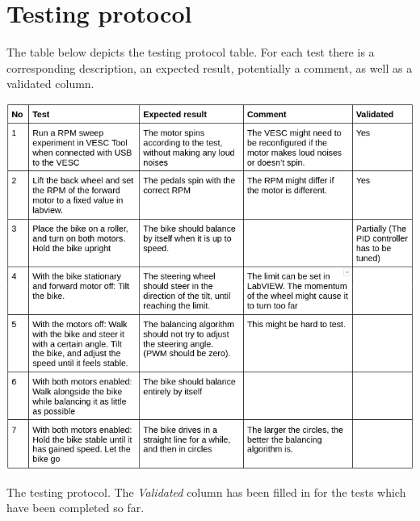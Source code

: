 \chapter{Testing protocol} \label{testingProtocol}

The table below depicts the testing protocol table. For each test there is a corresponding description, an expected result, potentially a comment, as well as a validated column.

\begin{table}[h]
    \centering
    \includegraphics[width=\textwidth]{figure/testing protocol.png}
    \caption{The testing protocol. The \textit{Validated} column has been filled in for the tests which have been completed so far.}
\end{table}